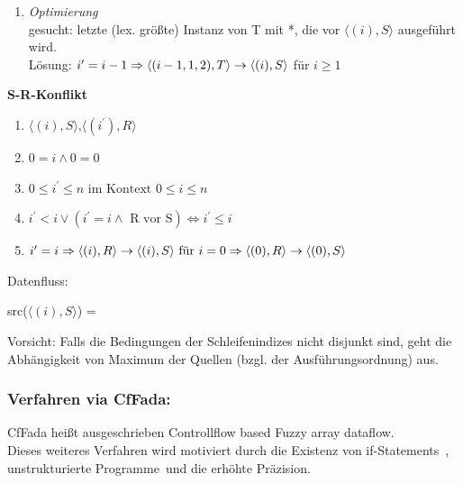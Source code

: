 \begin{enumerate}
\item \textit{Optimierung}\\
    gesucht: letzte (lex. größte) Instanz von T mit *, die vor $\langle (i), S \rangle$ ausgeführt wird. \\
    Lösung: $i^\prime = i-1\\
            \Rightarrow \langle (i-1,1,2), T \rangle \rightarrow \langle (i), S \rangle$ für $i \geq 1$
\end{enumerate}

\textbf{S-R-Konflikt}\\
    \begin{enumerate}
    \item $\langle (i), S \rangle \text{,} \langle(i^\prime), R \rangle$
    \item $0=i \land 0 = 0$
    \item $0 \leq i^\prime \leq n \text{ im Kontext } 0 \leq i \leq n$
    \item $i^\prime < i \lor (i^\prime = i \land \text{ R vor S}) \Leftrightarrow i^\prime \leq i$
    \item $i^\prime = i \\
        \Rightarrow \langle (i),R \rangle \rightarrow \langle (i), S \rangle \text{ für } i=0 \\
        \Rightarrow \langle (0),R \rangle \rightarrow \langle (0), S \rangle$

    \end{enumerate}
Datenfluss: \\
\begin{procedure}
    src($ \langle (i), S \rangle $) =\\ 
\end{procedure}

Vorsicht: Falls die Bedingungen der Schleifenindizes nicht disjunkt sind, geht die Abhängigkeit von Maximum der Quellen (bzgl. der Ausführungsordnung) aus.


\subsubsection{Verfahren via CfFada:}

CfFada heißt ausgeschrieben \glqq Controllflow based Fuzzy array dataflow\grqq.\\
Dieses weiteres Verfahren wird motiviert durch die Existenz von \glqq if-Statements\grqq\ , \glqq unstrukturierte Programme\grqq\ und die erhöhte \glqq Präzision\grqq.\\
